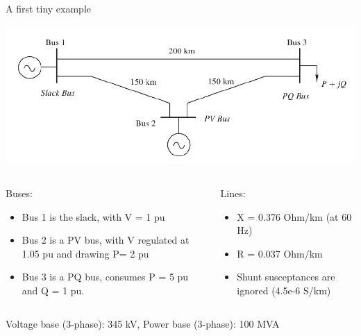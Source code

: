 \begin{frame}[allowframebreaks]{A first tiny example}
    \begin{center}
        \includegraphics[width=0.6\linewidth]{images/PF_net_1.png}
    \end{center}
    \begin{columns}
        \begin{column}{0.5\linewidth}
            Buses:
            \begin{itemize}
                \item Bus 1 is the slack, with V = 1 pu
                \item Bus 2 is a PV bus, with V regulated at 1.05 pu and drawing P= 2 pu
                \item Bus 3 is a PQ bus, consumes P = 5 pu and Q = 1 pu.
            \end{itemize}
        \end{column}
        \begin{column}{0.5\linewidth}
            Lines:
            \begin{itemize}
                \item X = 0.376 Ohm/km (at 60 Hz)
                \item R = 0.037 Ohm/km
                \item Shunt susceptances are ignored (4.5e-6 S/km)
            \end{itemize}
        \end{column}
    \end{columns}
    Voltage base (3-phase): 345 kV,
    Power base (3-phase): 100 MVA
\end{frame}

